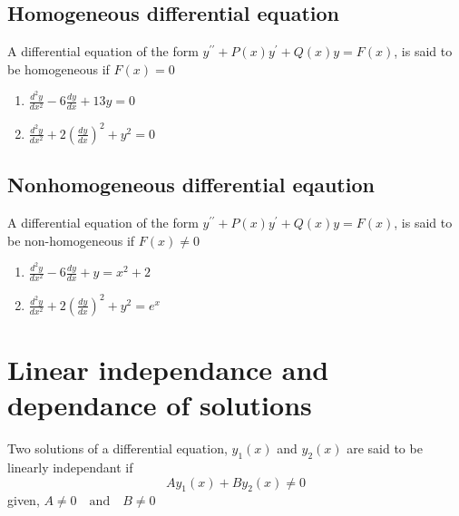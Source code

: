 \subsection{Homogeneous differential equation}
A differential equation of the form
$y^{\prime \prime}+P(x) y^{\prime}+Q(x) y=F(x)$, is said to be  homogeneous if $F(x)= 0$
\begin{example}
	\hspace{0.5cm}
	\begin{enumerate}
		\item 	$\frac{d^{2} y}{d x^{2}}-6 \frac{d y}{d x}+13 y=0$
		\item $\frac{d^{2} y}{d x^{2}}+2\left(\frac{d y}{d x}\right)^{2}+y^{2}=0$
	\end{enumerate}

\end{example}
\subsection{Nonhomogeneous differential eqaution} A differential equation of the form
$y^{\prime \prime}+P(x) y^{\prime}+Q(x) y=F(x)$, is said to be  non-homogeneous if $F(x)\neq 0$
\begin{example}
\hspace{0.5cm}
\begin{enumerate}
	\item 	$\frac{d^{2} y}{d x^{2}}-6 \frac{d y}{d x}+ y=x^{2}+2$
	\item $\frac{d^{2} y}{d x^{2}}+2\left(\frac{d y}{d x}\right)^{2}+y^{2}=e^{x}$
\end{enumerate}
\end{example}
\section{Linear independance and dependance of solutions}
Two solutions of a differential equation, $ y_{1}(x)$ and $ y_{2}(x)$ are said to be linearly independant if \\$$Ay_{1}(x)+By_{2}(x)\neq 0 $$ given, $ A\neq0 \quad\text{and}\quad B\neq0$
